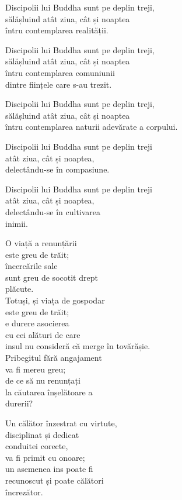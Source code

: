 Discipolii lui Buddha sunt pe deplin treji,\\
sălășluind atât ziua, cât și noaptea\\
întru contemplarea realității.


Discipolii lui Buddha sunt pe deplin treji,\\
sălășluind atât ziua, cât și noaptea\\
întru contemplarea comuniunii\\
dintre ființele care s-au trezit.


Discipolii lui Buddha sunt pe deplin treji,\\
sălășluind atât ziua, cât și noaptea\\
întru contemplarea naturii adevărate a corpului.


Discipolii lui Buddha sunt pe deplin treji\\
atât ziua, cât și noaptea,\\
delectându-se în compasiune.


Discipolii lui Buddha sunt pe deplin treji\\
atât ziua, cât și noaptea,\\
delectându-se în cultivarea\\
inimii.


O viață a renunțării\\
este greu de trăit;\\
încercările sale\\
sunt greu de socotit drept\\
plăcute.\\
Totuși, și viața de gospodar\\
este greu de trăit;\\
e durere asocierea\\
cu cei alături de care\\
insul nu consideră că merge în tovărășie.\\
Pribegitul fără angajament\\
va fi mereu greu;\\
de ce să nu renunțați\\
la căutarea înșelătoare a\\
durerii?


Un călător înzestrat cu virtute,\\
disciplinat și dedicat\\
conduitei corecte,\\
va fi primit cu onoare;\\
un asemenea ins poate fi\\
recunoscut și poate călători\\
încrezător.


